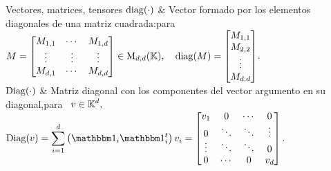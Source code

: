 \begin{notation}{Vectores, matrices, tensores}
\hline
%
$\operatorname{diag}(\cdot)$  & Vector  formado  por  los elementos  diagonales  de una  matriz
cuadrada:\vspace{1mm}\newline para
 \ $\displaystyle M = \protect\begin{bmatrix}
  M_{1,1}  & \cdots & M_{1,d} \\
  \vdots  & \vdots & \vdots \\
  M_{d,1} & \cdots & M_{d,d}
\end{bmatrix}\protect
 \in \mathrm{M}_{d,d}(\mathbb{K}), \quad \operatorname{diag}(M) =
 \protect\begin{bmatrix} M_{1,1} \\M_{2,2} \\ \vdots \\ M_{d,d}
\end{bmatrix}\protect
$.\vspace{1mm}\\[2.5mm]
%
\hline
%
$\operatorname{Diag}(\cdot)$ & Matriz diagonal  con los componentes del vector argumento en su
diagonal,\vspace{1mm}\newline para \ $\displaystyle v \in \mathbb{K}^d,$\vspace{1mm}\newline
$\displaystyle \Diag(v) = \sum_{i=1}^d \left( \un_i \un_i^t \right) v_i =
\protect\begin{bmatrix}
  v_1  &   0    & \cdots &    0   \\[-.25mm]
   0   & \ddots & \ddots & \vdots \\[-1mm]
\vdots & \ddots & \ddots &    0   \\[-.25mm]
   0   & \cdots &    0   &   v_d
\end{bmatrix}\protect$.\vspace{1mm}\\[2.5mm]
%

\end{notation}
